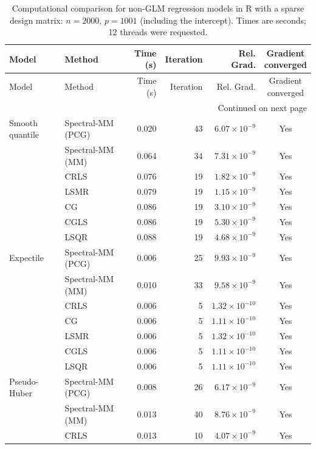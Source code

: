 \clearpage
\begingroup
\small
\setlength{\tabcolsep}{4pt}
\begin{longtable}{llrrrc}
\caption{Computational comparison for non-GLM regression models in R with a sparse design matrix: $n=2000$, $p=1001$ (including the intercept). Times are seconds; 12 threads were requested.}
\label{tab:R-sparse-nonglm-initial}\\
\toprule
Model & Method & Time (s) & Iteration & Rel. Grad. & \shortstack{Gradient\\converged} \\
\midrule
\endfirsthead
\toprule
Model & Method & Time (s) & Iteration & Rel. Grad. & \shortstack{Gradient\\converged} \\
\midrule
\endhead
\midrule
\multicolumn{6}{r}{Continued on next page}\\
\endfoot
\bottomrule
\endlastfoot
Smooth quantile & Spectral-MM (PCG) & 0.020 & 43 & $6.07\times10^{-9}$ & Yes \\
 & Spectral-MM (MM) & 0.064 & 34 & $7.31\times10^{-9}$ & Yes \\
 & CRLS & 0.076 & 19 & $1.82\times10^{-9}$ & Yes \\
 & LSMR & 0.079 & 19 & $1.15\times10^{-9}$ & Yes \\
 & CG & 0.086 & 19 & $3.10\times10^{-9}$ & Yes \\
 & CGLS & 0.086 & 19 & $5.30\times10^{-9}$ & Yes \\
 & LSQR & 0.088 & 19 & $4.68\times10^{-9}$ & Yes \\
\midrule
Expectile & Spectral-MM (PCG) & 0.006 & 25 & $9.93\times10^{-9}$ & Yes \\
 & Spectral-MM (MM) & 0.010 & 33 & $9.58\times10^{-9}$ & Yes \\
 & CRLS & 0.006 & 5 & $1.32\times10^{-10}$ & Yes \\
 & CG & 0.006 & 5 & $1.11\times10^{-10}$ & Yes \\
 & LSMR & 0.006 & 5 & $1.32\times10^{-10}$ & Yes \\
 & CGLS & 0.006 & 5 & $1.11\times10^{-10}$ & Yes \\
 & LSQR & 0.006 & 5 & $1.11\times10^{-10}$ & Yes \\
\midrule
Pseudo-Huber & Spectral-MM (PCG) & 0.008 & 26 & $6.17\times10^{-9}$ & Yes \\
 & Spectral-MM (MM) & 0.013 & 40 & $8.76\times10^{-9}$ & Yes \\
 & CRLS & 0.013 & 10 & $4.07\times10^{-9}$ & Yes \\

\end{longtable}
